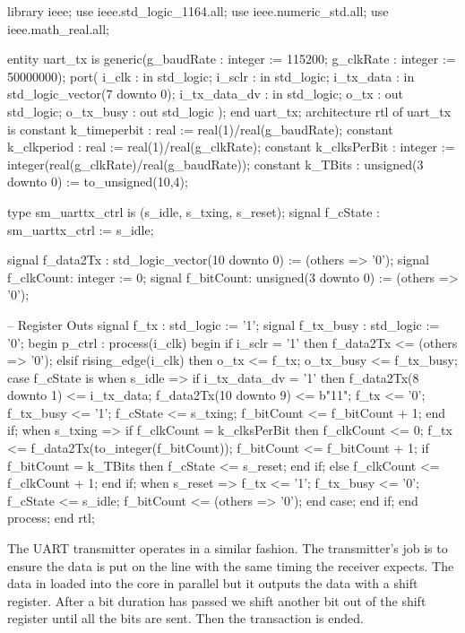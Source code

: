 \begin{VHDLlisting}[tabsize=8]
library ieee;
  use ieee.std_logic_1164.all;
  use ieee.numeric_std.all;
  use ieee.math_real.all;
  
entity uart_tx is
  generic(g_baudRate : integer := 115200;
          g_clkRate  : integer := 50000000);
  port(
      i_clk        : in    std_logic;
      i_sclr       : in    std_logic;
      i_tx_data    : in    std_logic_vector(7 downto 0);
      i_tx_data_dv : in    std_logic;
      o_tx         :   out std_logic;
      o_tx_busy    :   out std_logic
      );
end uart_tx;
architecture rtl of uart_tx is 
  constant k_timeperbit : real := real(1)/real(g_baudRate);
  constant k_clkperiod  : real := real(1)/real(g_clkRate);
  constant k_clksPerBit : integer := 
                          integer(real(g_clkRate)/real(g_baudRate)); 
  constant k_TBits      : unsigned(3 downto 0) := to_unsigned(10,4);
  
  type sm_uarttx_ctrl is (s_idle, s_txing, s_reset);
  signal f_cState : sm_uarttx_ctrl := s_idle;
  
  signal f_data2Tx : std_logic_vector(10 downto 0) := (others => '0');
  signal f_clkCount: integer := 0;
  signal f_bitCount: unsigned(3 downto 0) := (others => '0');
  
  -- Register Outs
  signal f_tx : std_logic := '1';
  signal f_tx_busy : std_logic := '0';
begin
  p_ctrl : process(i_clk) 
  begin
    if i_sclr = '1' then
        f_data2Tx <= (others => '0');
    elsif rising_edge(i_clk) then
      o_tx <= f_tx;
      o_tx_busy <= f_tx_busy;
      case f_cState is  
        when s_idle =>
          if i_tx_data_dv = '1' then
            f_data2Tx(8 downto 1) <= i_tx_data;
            f_data2Tx(10 downto 9) <= b"11";
            f_tx <= '0';
            f_tx_busy <= '1';
            f_cState <= s_txing;
            f_bitCount <= f_bitCount + 1;
          end if;
        when s_txing => 
          if f_clkCount = k_clksPerBit then
            f_clkCount <= 0;
            f_tx <= f_data2Tx(to_integer(f_bitCount));
            f_bitCount <= f_bitCount + 1;
            if f_bitCount = k_TBits then
              f_cState <= s_reset;
            end if;
          else
            f_clkCount <= f_clkCount + 1;
          end if;
        when s_reset => 
          f_tx <= '1';
          f_tx_busy <= '0';
          f_cState <= s_idle;
          f_bitCount <= (others => '0');
      end case;
    end if;
  end process;
end rtl;
\end{VHDLlisting}
	
The \ac{UART} transmitter operates in a similar fashion. The transmitter's job is to ensure the data is put on the line with the same timing the receiver expects. The data in loaded into the core in parallel but it outputs the data with a shift register. After a bit duration has passed we shift another bit out of the shift register until all the bits are sent. Then the transaction is ended.
	

